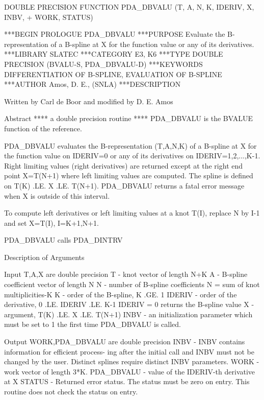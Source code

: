 \documentclass[11pt,twoside,nolof]{starlink}
\begin{document}
\begin{terminalv}
      DOUBLE PRECISION FUNCTION PDA_DBVALU (T, A, N, K, IDERIV, X, INBV,
     +   WORK, STATUS)


***BEGIN PROLOGUE  PDA_DBVALU
***PURPOSE  Evaluate the B-representation of a B-spline at X for the
            function value or any of its derivatives.
***LIBRARY   SLATEC
***CATEGORY  E3, K6
***TYPE      DOUBLE PRECISION (BVALU-S, PDA_DBVALU-D)
***KEYWORDS  DIFFERENTIATION OF B-SPLINE, EVALUATION OF B-SPLINE
***AUTHOR  Amos, D. E., (SNLA)
***DESCRIPTION

     Written by Carl de Boor and modified by D. E. Amos

     Abstract   **** a double precision routine ****
         PDA_DBVALU is the BVALUE function of the reference.

         PDA_DBVALU evaluates the B-representation (T,A,N,K) of a B-spline
         at X for the function value on IDERIV=0 or any of its
         derivatives on IDERIV=1,2,...,K-1.  Right limiting values
         (right derivatives) are returned except at the right end
         point X=T(N+1) where left limiting values are computed.  The
         spline is defined on T(K) .LE. X .LE. T(N+1).  PDA_DBVALU returns
         a fatal error message when X is outside of this interval.

         To compute left derivatives or left limiting values at a
         knot T(I), replace N by I-1 and set X=T(I), I=K+1,N+1.

         PDA_DBVALU calls PDA_DINTRV

     Description of Arguments

         Input      T,A,X are double precision
          T       - knot vector of length N+K
          A       - B-spline coefficient vector of length N
          N       - number of B-spline coefficients
                    N = sum of knot multiplicities-K
          K       - order of the B-spline, K .GE. 1
          IDERIV  - order of the derivative, 0 .LE. IDERIV .LE. K-1
                    IDERIV = 0 returns the B-spline value
          X       - argument, T(K) .LE. X .LE. T(N+1)
          INBV    - an initialization parameter which must be set
                    to 1 the first time PDA_DBVALU is called.

         Output     WORK,PDA_DBVALU are double precision
          INBV    - INBV contains information for efficient process-
                    ing after the initial call and INBV must not
                    be changed by the user.  Distinct splines require
                    distinct INBV parameters.
          WORK    - work vector of length 3*K.
      PDA_DBVALU  - value of the IDERIV-th derivative at X
          STATUS  - Returned error status.
                    The status must be zero on entry. This
                    routine does not check the status on entry.


\end{terminalv}
\end{document}
